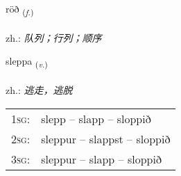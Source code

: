 \documentclass[frontgrid, backgrid]{flacards}\usepackage[]{graphicx}\usepackage[]{xcolor}
\begin{document}
\renewcommand{\flhead}{\vskip5pt \fboxsep=0pt {\small\bfseries\footnotesize Nafnorð | 名词}}
\renewcommand{\fcfoot}{\vskip5pt \fboxsep=0pt \hspace{2pt}{\small\bfseries\footnotesize 1K}}

\renewcommand{\blhead}{\vskip5pt {\small\bfseries\footnotesize Nafnorð | 名词 }}
\renewcommand{\bcfoot}{\vskip5pt \hspace{2pt}{\small\bfseries\footnotesize 1K}}


{röð \small{\textsubscript{(\textit{f.})}} \\[1ex] %
\textphonetic{[rœːð]} \\
zh.: \emph{队列；行列；顺序} \\  [2ex]
\renewcommand*{\arraystretch}{0.8}
}

\renewcommand{\flhead}{\vskip5pt \fboxsep=0pt {\small\bfseries\footnotesize Sagnorð | 动词}}
\renewcommand{\fcfoot}{\vskip5pt \fboxsep=0pt \hspace{2pt}{\small\bfseries\footnotesize 1K}}

\renewcommand{\blhead}{\vskip5pt {\small\bfseries\footnotesize Sagnorð | 动词 }}
\renewcommand{\bcfoot}{\vskip5pt \hspace{2pt}{\small\bfseries\footnotesize 1K}}


{sleppa \small{\textsubscript{(\textit{v.})}} \\[1ex] %
\textphonetic{[stlɛhpa]} \\
zh.: \emph{逃走，逃脱} \\  [2ex]
\renewcommand*{\arraystretch}{0.8}
\begin{tabular}{p{1cm}l}
\textsc{1sg}: & slepp -- slapp -- sloppið \\ 
\textsc{2sg}: & sleppur -- slappst -- sloppið \\ 
\textsc{3sg}: & sleppur -- slapp -- sloppið \\ 
\end{tabular}
}
\end{document}
